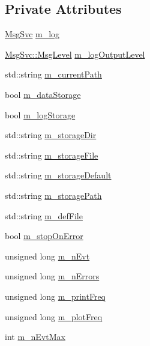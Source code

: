 \subsection*{Private Attributes}
\begin{DoxyCompactItemize}
\item 
\hyperlink{classMsgSvc}{Msg\+Svc} \hyperlink{classOptions_a80d2caed71dd935c104f0133504251e9}{m\+\_\+log}
\item 
\hyperlink{classMsgSvc_ae671eb7301996cd049d2da8a65925926}{Msg\+Svc\+::\+Msg\+Level} \hyperlink{classOptions_a9ecfefe6bf44ff519369f38eb5c8147a}{m\+\_\+log\+Output\+Level}
\item 
std\+::string \hyperlink{classOptions_a9d82ad17fc1fd2315fc8a9e8d0d34f33}{m\+\_\+current\+Path}
\item 
bool \hyperlink{classOptions_a244898bb30c9f716bdc335b4d85d1dfb}{m\+\_\+data\+Storage}
\item 
bool \hyperlink{classOptions_ab7ffad5110df714233470725ef98be6e}{m\+\_\+log\+Storage}
\item 
std\+::string \hyperlink{classOptions_a88d9ed92fceb1c91e4df59bc1f81ab3b}{m\+\_\+storage\+Dir}
\item 
std\+::string \hyperlink{classOptions_a4d952db4e93d3aae6db86d89faa3677a}{m\+\_\+storage\+File}
\item 
std\+::string \hyperlink{classOptions_ab077e872fd03f7bf64f3a354d0c4a2f5}{m\+\_\+storage\+Default}
\item 
std\+::string \hyperlink{classOptions_ad125e827cb30bc9b63875ec45b31ef5e}{m\+\_\+storage\+Path}
\item 
std\+::string \hyperlink{classOptions_a59ff5f2cab2490fb529367de13a2321a}{m\+\_\+def\+File}
\item 
bool \hyperlink{classOptions_a879c2741a290595adb3f74633f3a3987}{m\+\_\+stop\+On\+Error}
\item 
unsigned long \hyperlink{classOptions_a5e3bb1f2dfc4bf10cab08a33253cc4db}{m\+\_\+n\+Evt}
\item 
unsigned long \hyperlink{classOptions_ae6460776ac3433103d88729a6811fc56}{m\+\_\+n\+Errors}
\item 
unsigned long \hyperlink{classOptions_acf8f96cbc3245ec4b3b47bd3bfa0d742}{m\+\_\+print\+Freq}
\item 
unsigned long \hyperlink{classOptions_aa7f7161bc67732b310937afb137657a0}{m\+\_\+plot\+Freq}
\item 
int \hyperlink{classOptions_a825a47258257937a8caa902f5fff7e8a}{m\+\_\+n\+Evt\+Max}
\item 

\end{DoxyCompactItemize}

